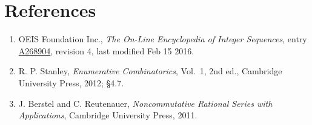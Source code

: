 \documentclass[11pt]{article}
\theoremstyle{definition}
\begin{document}
\section{References}

\begin{enumerate}

\item OEIS Foundation Inc., \emph{The On-Line Encyclopedia of Integer Sequences}, entry \href{https://oeis.org/A268904}{A268904}, revision 4, last modified Feb 15 2016.

\item R. P. Stanley, \emph{Enumerative Combinatorics}, Vol.~1, 2nd ed., Cambridge University Press, 2012; \S4.7.

\item J. Berstel and C. Reutenauer, \emph{Noncommutative Rational Series with Applications}, Cambridge University Press, 2011.

\end{enumerate}
\end{document}
